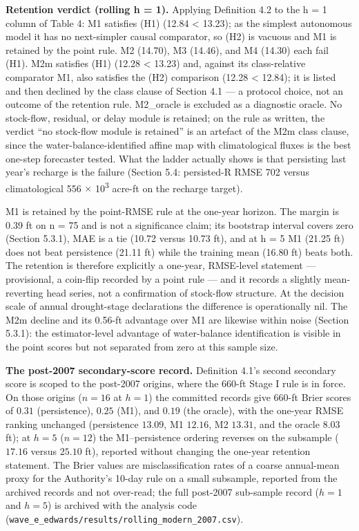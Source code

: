 \documentclass[11pt]{article}
\begin{document}
\textbf{Retention verdict (rolling h = 1).} Applying Definition 4.2 to
the h = 1 column of Table 4: M1 satisfies (H1) (12.84 \textless{}
13.23); as the simplest autonomous model it has no next-simpler causal
comparator, so (H2) is vacuous and M1 is retained by the point rule. M2
(14.70), M3 (14.46), and M4 (14.30) each fail (H1). M2m satisfies (H1)
(12.28 \textless{} 13.23) and, against its class-relative comparator M1,
also satisfies the (H2) comparison (12.28 \textless{} 12.84); it is
listed and then declined by the class clause of Section 4.1 --- a
protocol choice, not an outcome of the retention rule. M2\_oracle is
excluded as a diagnostic oracle. No stock-flow, residual, or delay
module is retained; on the rule as written, the verdict ``no stock-flow
module is retained'' is an artefact of the M2m class clause, since the
water-balance-identified affine map with climatological fluxes is the
best one-step forecaster tested. What the ladder actually shows is that
persisting last year's recharge is the failure (Section 5.4: persisted-R
RMSE 702 versus climatological 556 \ensuremath{\times} 10\textsuperscript{3} acre-ft on the recharge
target).

M1 is retained by the point-RMSE rule at the one-year horizon. The
margin is 0.39 ft on n = 75 and is not a significance claim; its
bootstrap interval covers zero (Section 5.3.1), MAE is a tie (10.72
versus 10.73 ft), and at h = 5 M1 (21.25 ft) does not beat persistence
(21.11 ft) while the training mean (16.80 ft) beats both. The retention
is therefore explicitly a one-year, RMSE-level statement ---
provisional, a coin-flip recorded by a point rule --- and it records a
slightly mean-reverting head series, not a confirmation of stock-flow
structure. At the decision scale of annual drought-stage declarations
the difference is operationally nil. The M2m decline and its 0.56-ft
advantage over M1 are likewise within noise (Section 5.3.1): the
estimator-level advantage of water-balance identification is visible in
the point scores but not separated from zero at this sample size.

\textbf{The post-2007 secondary-score record.} Definition 4.1's second
secondary score is scoped to the post-2007 origins, where the 660-ft
Stage I rule is in force. On those origins (\(n = 16\) at \(h = 1\)) the
committed records give 660-ft Brier scores of \(0.31\) (persistence),
\(0.25\) (M1), and \(0.19\) (the oracle), with the one-year RMSE ranking
unchanged (persistence \(13.09\), M1 \(12.16\), M2 \(13.31\), and the
oracle \(8.03\) ft); at \(h = 5\) (\(n = 12\)) the M1--persistence
ordering reverses on the subsample (\(17.16\) versus \(25.10\) ft),
reported without changing the one-year retention statement. The Brier
values are misclassification rates of a coarse annual-mean proxy for the
Authority's 10-day rule on a small subsample, reported from the archived
records and not over-read; the full post-2007 sub-sample record
(\(h = 1\) and \(h = 5\)) is archived with the analysis code
(\texttt{wave\_e\_edwards/results/rolling\_modern\_2007.csv}).
\end{document}
